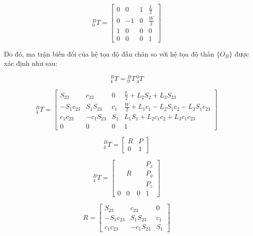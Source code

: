 \begin{equation}
^{B}_{0}T=
\begin{bmatrix}
0 & 0 & 1 & \frac{L}{2} \\
0 & -1 & 0 & \frac{W}{2} \\
1 & 0 & 0 & 0 \\
0 & 0 & 0 & 1
\end{bmatrix}
\end{equation}

Do đó, ma trận biến đổi của hệ tọa độ đầu chân so với hệ tọa độ thân $\{O_B\}$ được xác định như sau:

\begin{equation}
^{B}_{4}T = {}^{B}_{0}T \, {}^{0}_{4}T
\end{equation}

\begin{equation}
{}^{B}_{4}T =
\begin{bmatrix}
S_{23} & c_{23} & 0 & \frac{L}{2} + L_2 S_2 + L_3 S_{23} \\
- S_1 c_{23} & S_1 S_{23} & c_1 & \frac{W}{2} + L_1 c_1 - L_2 S_1 c_2 - L_3 S_1 c_{23} \\
c_1 c_{23} & - c_1 S_{23} & S_1 & L_1 S_1 + L_2 c_1 c_2 + L_3 c_1 c_{23} \\
0 & 0 & 0 & 1
\end{bmatrix}
\end{equation}

\begin{equation}
{}^{B}_{4}T=
\begin{bmatrix}
R & P \\
0 & 1
\end{bmatrix}
\end{equation}

\begin{equation}
{}^{B}_{4}T=
\begin{bmatrix}
 &  &  & P_x \\
 & R &  & P_y \\
 &  &  & P_z \\
0 & 0 & 0 & 1
\end{bmatrix}
\end{equation}

\begin{equation}
R=
\begin{bmatrix}
S_{23} & c_{23} & 0 \\
- S_1 c_{23} & S_1 S_{23} & c_1 \\
c_1 c_{23} & - c_1 S_{23} & S_1
\end{bmatrix}
\end{equation}

